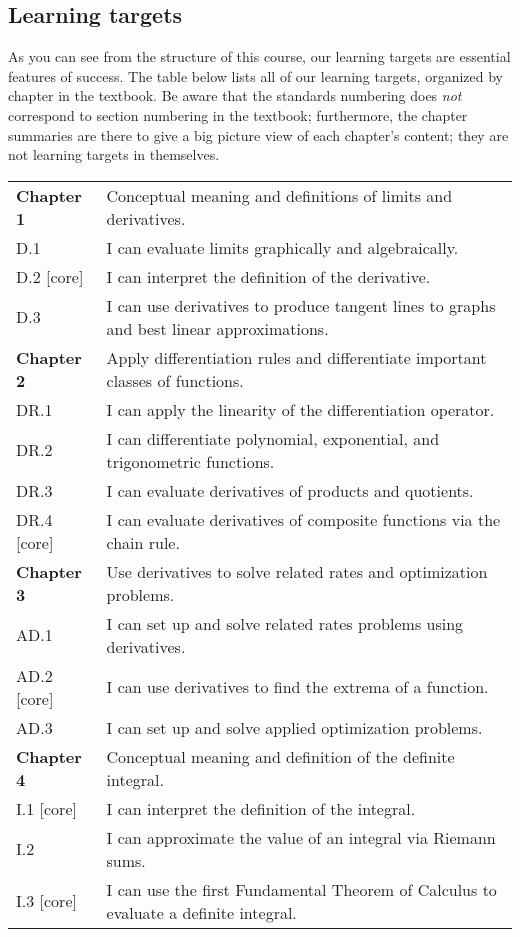 \documentclass[11pt,twoside]{amsart}
\begin{document}
\subsection*{Learning targets}
As you can see from the structure of this course, our learning targets are essential features of success. The table below lists all of our learning targets, organized by chapter in the textbook. Be aware that the standards numbering does \emph{not} correspond to section numbering in the textbook; furthermore, the chapter summaries are there to give a big picture view of each chapter's content; they are not learning targets in themselves.

\renewcommand{\arraystretch}{1.2}
\begin{center}
\begin{longtable}{@{}ll@{}}
\toprule
\textbf{Chapter 1} & Conceptual meaning and definitions of limits and derivatives.\\
D.1 & I can evaluate limits graphically and algebraically.\\
D.2 [core] & I can interpret the definition of the derivative.\\
D.3 & I can use derivatives to produce tangent lines to graphs and best linear approximations.\\
\midrule

\textbf{Chapter 2} & Apply differentiation rules and differentiate important classes of functions.\\
DR.1 & I can apply the linearity of the differentiation operator.\\
DR.2 & I can differentiate polynomial, exponential, and trigonometric functions.\\
DR.3 & I can evaluate derivatives of products and quotients.\\
DR.4 [core] & I can evaluate derivatives of composite functions via the chain rule.\\
\midrule

\textbf{Chapter 3} & Use derivatives to solve related rates and optimization problems.\\
AD.1 & I can set up and solve related rates problems using derivatives.\\
AD.2 [core] & I can use derivatives to find the extrema of a function.\\
AD.3 & I can set up and solve applied optimization problems.\\
\midrule

\textbf{Chapter 4} & Conceptual meaning and definition of the definite integral.\\
I.1 [core] & I can interpret the definition of the integral.\\
I.2 & I can approximate the value of an integral via Riemann sums.\\
I.3 [core] & I can use the first Fundamental Theorem of Calculus to evaluate a definite integral.\\
\midrule


\end{longtable}
\end{center}
\end{document}
